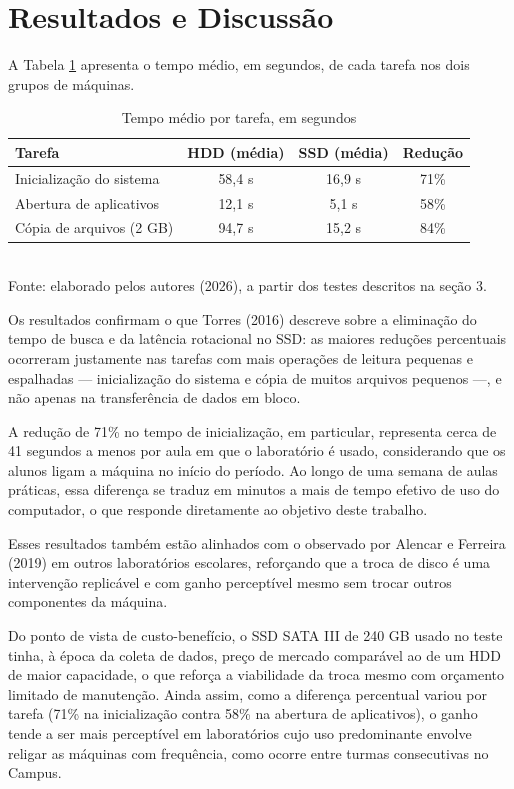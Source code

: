 \documentclass[article,12pt,a4paper]{abntex2}
\begin{document}
\section{Resultados e Discussão}

A Tabela \ref{tab:resultados} apresenta o tempo médio, em segundos, de cada
tarefa nos dois grupos de máquinas.

\begin{table}[!ht]
  \centering
  \caption{Tempo médio por tarefa, em segundos}
  \label{tab:resultados}
  \begin{tabular}{lccc}
    \hline
    Tarefa & HDD (média) & SSD (média) & Redução \\
    \hline
    Inicialização do sistema & 58,4 s & 16,9 s & 71\% \\
    Abertura de aplicativos  & 12,1 s & 5,1 s  & 58\% \\
    Cópia de arquivos (2 GB) & 94,7 s & 15,2 s & 84\% \\
    \hline
  \end{tabular}
  \\[0.3em]
  {\footnotesize Fonte: elaborado pelos autores (2026), a partir dos testes descritos na seção 3.}
\end{table}

Os resultados confirmam o que Torres (2016) descreve sobre a eliminação do
tempo de busca e da latência rotacional no SSD: as maiores reduções
percentuais ocorreram justamente nas tarefas com mais operações de leitura
pequenas e espalhadas — inicialização do sistema e cópia de muitos arquivos
pequenos —, e não apenas na transferência de dados em bloco.

A redução de 71\% no tempo de inicialização, em particular, representa cerca
de 41 segundos a menos por aula em que o laboratório é usado, considerando
que os alunos ligam a máquina no início do período. Ao longo de uma semana
de aulas práticas, essa diferença se traduz em minutos a mais de tempo
efetivo de uso do computador, o que responde diretamente ao objetivo deste
trabalho.

Esses resultados também estão alinhados com o observado por Alencar e
Ferreira (2019) em outros laboratórios escolares, reforçando que a troca de
disco é uma intervenção replicável e com ganho perceptível mesmo sem trocar
outros componentes da máquina.

Do ponto de vista de custo-benefício, o SSD SATA III de 240 GB usado no
teste tinha, à época da coleta de dados, preço de mercado comparável ao de
um HDD de maior capacidade, o que reforça a viabilidade da troca mesmo com
orçamento limitado de manutenção. Ainda assim, como a diferença percentual
variou por tarefa (71\% na inicialização contra 58\% na abertura de
aplicativos), o ganho tende a ser mais perceptível em laboratórios cujo uso
predominante envolve religar as máquinas com frequência, como ocorre entre
turmas consecutivas no Campus.
\end{document}
